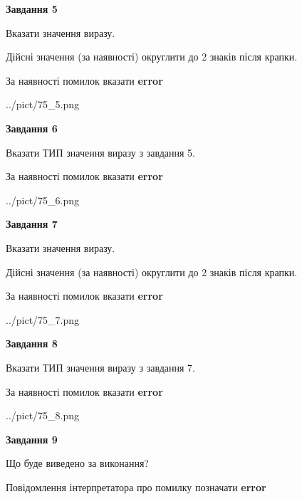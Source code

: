 \documentclass[11pt, ukrainian]{article}
\begin{document}
{\begin {large}
{\begin {center}\textbf{Завдання 5}\end {center}}\par
Вказати значення виразу. \par
Дійсні значення (за наявності) округлити до 2 знаків після крапки. \par
За наявності помилок вказати \textbf{error}

\begin{center}
	{../pict/75_5.png}
\end{center}
\newpage

{\begin {center}\textbf{Завдання 6}\end {center}}\par
Вказати ТИП значення виразу з завдання 5. \par
За наявності помилок вказати \textbf{error}

\begin{center}
	{../pict/75_6.png}
\end{center}
\newpage

{\begin {center}\textbf{Завдання 7}\end {center}}\par
Вказати значення виразу. \par
Дійсні значення (за наявності) округлити до 2 знаків після крапки. \par
За наявності помилок вказати \textbf{error}

\begin{center}
	{../pict/75_7.png}
\end{center}
\newpage

{\begin {center}\textbf{Завдання 8}\end {center}}\par
Вказати ТИП значення виразу з завдання 7. \par
За наявності помилок вказати \textbf{error}

\begin{center}
	{../pict/75_8.png}
\end{center}
\newpage

{\begin {center}\textbf{Завдання 9}\end {center}}\par
Що буде виведено за виконання? \par
Повідомлення інтерпретатора про помилку позначати \textbf{error}


\end{large}}
\end{document}
